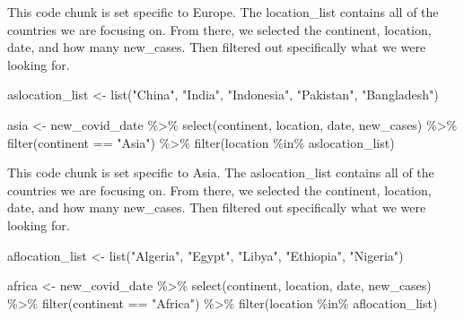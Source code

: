 \documentclass[
]{article}
\newenvironment{Shaded}{\begin{snugshade}}{\end{snugshade}}
\newcommand{\FunctionTok}[1]{\textcolor[rgb]{0.00,0.00,0.00}{#1}}
\newcommand{\NormalTok}[1]{#1}
\newcommand{\OtherTok}[1]{\textcolor[rgb]{0.56,0.35,0.01}{#1}}
\newcommand{\SpecialCharTok}[1]{\textcolor[rgb]{0.00,0.00,0.00}{#1}}
\newcommand{\StringTok}[1]{\textcolor[rgb]{0.31,0.60,0.02}{#1}}
\begin{document}
This code chunk is set specific to Europe. The location\_list contains
all of the countries we are focusing on. From there, we selected the
continent, location, date, and how many new\_cases. Then filtered out
specifically what we were looking for.

\begin{Shaded}
\begin{Highlighting}[]
\NormalTok{aslocation\_list }\OtherTok{\textless{}{-}} \FunctionTok{list}\NormalTok{(}\StringTok{"China"}\NormalTok{, }\StringTok{"India"}\NormalTok{, }\StringTok{"Indonesia"}\NormalTok{, }\StringTok{"Pakistan"}\NormalTok{, }\StringTok{"Bangladesh"}\NormalTok{)}

\NormalTok{asia }\OtherTok{\textless{}{-}}\NormalTok{ new\_covid\_date }\SpecialCharTok{\%\textgreater{}\%} 
  \FunctionTok{select}\NormalTok{(continent, location, date, new\_cases) }\SpecialCharTok{\%\textgreater{}\%} 
  \FunctionTok{filter}\NormalTok{(continent }\SpecialCharTok{==} \StringTok{"Asia"}\NormalTok{) }\SpecialCharTok{\%\textgreater{}\%} 
  \FunctionTok{filter}\NormalTok{(location }\SpecialCharTok{\%in\%}\NormalTok{ aslocation\_list)}
\end{Highlighting}
\end{Shaded}

This code chunk is set specific to Asia. The aslocation\_list contains
all of the countries we are focusing on. From there, we selected the
continent, location, date, and how many new\_cases. Then filtered out
specifically what we were looking for.

\begin{Shaded}
\begin{Highlighting}[]
\NormalTok{aflocation\_list }\OtherTok{\textless{}{-}} \FunctionTok{list}\NormalTok{(}\StringTok{"Algeria"}\NormalTok{, }\StringTok{"Egypt"}\NormalTok{, }\StringTok{"Libya"}\NormalTok{, }\StringTok{"Ethiopia"}\NormalTok{, }\StringTok{"Nigeria"}\NormalTok{)}

\NormalTok{africa }\OtherTok{\textless{}{-}}\NormalTok{ new\_covid\_date }\SpecialCharTok{\%\textgreater{}\%} 
  \FunctionTok{select}\NormalTok{(continent, location, date, new\_cases) }\SpecialCharTok{\%\textgreater{}\%} 
  \FunctionTok{filter}\NormalTok{(continent }\SpecialCharTok{==} \StringTok{"Africa"}\NormalTok{) }\SpecialCharTok{\%\textgreater{}\%} 
  \FunctionTok{filter}\NormalTok{(location }\SpecialCharTok{\%in\%}\NormalTok{ aflocation\_list)}
\end{Highlighting}
\end{Shaded}
\end{document}
